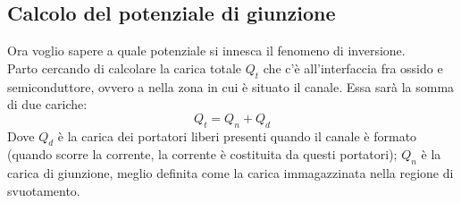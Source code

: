 \subsection{Calcolo del potenziale di giunzione}
Ora voglio sapere a quale potenziale si innesca il fenomeno di inversione.\\
Parto cercando di calcolare la carica totale $Q_t$ che c'è all'interfaccia fra ossido e semiconduttore, ovvero a nella zona in cui è situato il canale. Essa sarà la somma di due cariche:
%
\begin{equation}
    Q_t=Q_n+Q_d
\end{equation}
%
Dove $Q_d$ è la carica dei portatori liberi presenti quando il canale è formato (quando scorre la corrente, la corrente è costituita da questi portatori);
$Q_n$ è la carica di giunzione, meglio definita come la carica immagazzinata nella regione di svuotamento.\\

